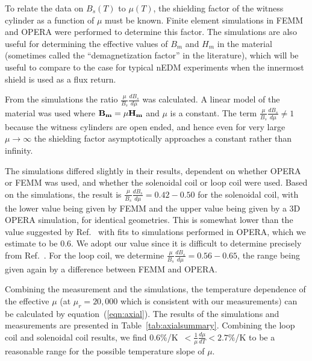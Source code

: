 To relate the data on $B_s(T)$ to $\mu(T)$, the shielding factor of
the witness cylinder as a function of $\mu$ must be known.  Finite
element simulations in FEMM and OPERA were performed to determine this
factor.  The simulations are also useful for determining the effective
values of $B_m$ and $H_m$ in the material (sometimes called the
``demagnetization factor'' in the literature), which will be useful to
compare to the case for typical nEDM experiments when the innermost
shield is used as a flux return.


From the simulations the ratio $\frac{\mu}{B_s} \frac{dB_s}{d\mu}$ was
calculated.  A linear model of the material was used where
$\bold{B_m}=\mu \bold{H_m}$ and $\mu$ is a constant.  The term
$\frac{\mu}{B_s}\frac{dB_s}{d\mu}\neq 1$ because the witness cylinders
are open ended, and hence even for very large $\mu\rightarrow\infty$
the shielding factor asymptotically approaches a constant rather than
infinity.

The simulations differed slightly in their results, dependent on
whether OPERA or FEMM was used, and whether the solenoidal coil or
loop coil were used.  Based on the simulations, the result is
$\frac{\mu}{B_s}\frac{dB_s}{d\mu}=0.42-0.50$ for the solenoidal coil,
with the lower value being given by FEMM and the upper value being
given by a 3D OPERA simulation, for identical geometries.  This is
somewhat lower than the value suggested by
Ref.~\cite{bib:paperno-open-ended} with fits to simulations performed
in OPERA, which we estimate to be 0.6.  We adopt our value since it is
difficult to determine precisely from
Ref.~\cite{bib:paperno-open-ended}.  For the loop coil, we determine
$\frac{\mu}{B_s}\frac{dB_s}{d\mu}=0.56-0.65$, the range being given
again by a difference between FEMM and OPERA.

Combining the measurement and the simulations, the temperature
dependence of the effective $\mu$ (at $\mu_r=20,000$ which is
consistent with our measurements) can be calculated by
equation~(\ref{eqn:axial}).  The results of the simulations and
measurements are presented in Table~\ref{tab:axialsummary}.  Combining
the loop coil and solenoidal coil results, we find
0.6\%/K~$<\frac{1}{\mu}\frac{d\mu}{dT}<2.7\%$/K to be a reasonable
range for the possible temperature slope of $\mu$.

